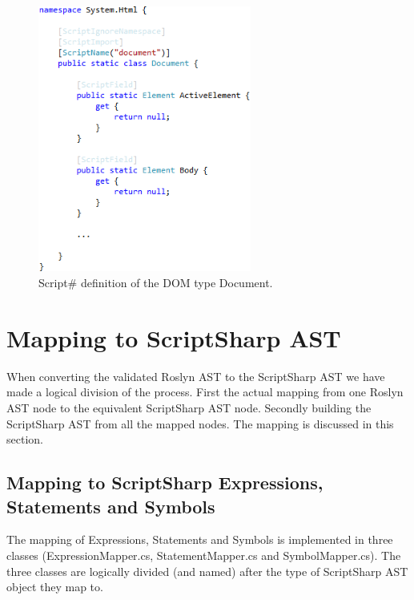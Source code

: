 		\begin{figure}[H]
				\includegraphics[width=7cm]{resources/images/Document.png}
			\caption{Script\# definition of the DOM type Document.}
			\label{fig:document}
		\end{figure}






\section{Mapping to ScriptSharp AST} %
\label{sec:mapping_to_scriptsharp_ast}
	When converting the validated Roslyn AST to the ScriptSharp AST we have made a logical division of the process. First the actual mapping from one Roslyn AST node to the equivalent ScriptSharp AST node. Secondly building the ScriptSharp AST from all the mapped nodes. The mapping is discussed in this section. 

	\subsection{Mapping to ScriptSharp Expressions, Statements and Symbols} %
	\label{sub:subsection_mapping_to_scriptsharp_expressions_statements_and_symbols}
		The mapping of Expressions, Statements and Symbols is implemented in three classes (ExpressionMapper.cs, StatementMapper.cs and SymbolMapper.cs). The three classes are logically divided (and named) after the type of ScriptSharp AST object they map to. 

